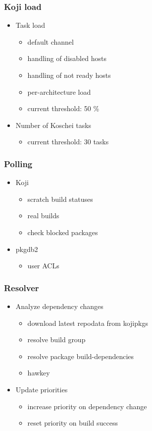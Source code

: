 \documentclass[pdftex,unicode,xcolor=table]{beamer}
\begin{document}
\begin{frame}
  \frametitle{Koji load}
  \begin{itemize}
    \item Task load
    \begin{itemize}
      \item default channel
      \item handling of disabled hosts
      \item handling of not ready hosts
      \item per-architecture load
      \item current threshold: 50 \%
    \end{itemize}
    \item Number of Koschei tasks
    \begin{itemize}
      \item current threshold: 30 tasks
    \end{itemize}
  \end{itemize}
\end{frame}

\begin{frame}
  \frametitle{Polling}
  \begin{itemize}
    \item Koji
    \begin{itemize}
      \item scratch build statuses
      \item real builds
      \item check blocked packages
    \end{itemize}
    \item pkgdb2
    \begin{itemize}
      \item user ACLs
    \end{itemize}
  \end{itemize}
\end{frame}

\begin{frame}
  \frametitle{Resolver}
  \begin{itemize}
    \item Analyze dependency changes
    \begin{itemize}
      \item download latest repodata from kojipkgs
      \item resolve build group
      \item resolve package build-dependencies
      \item hawkey
    \end{itemize}
    \item Update priorities
    \begin{itemize}
      \item increase priority on dependency change
      \item reset priority on build success
    \end{itemize}
  \end{itemize}
\end{frame}
\end{document}

